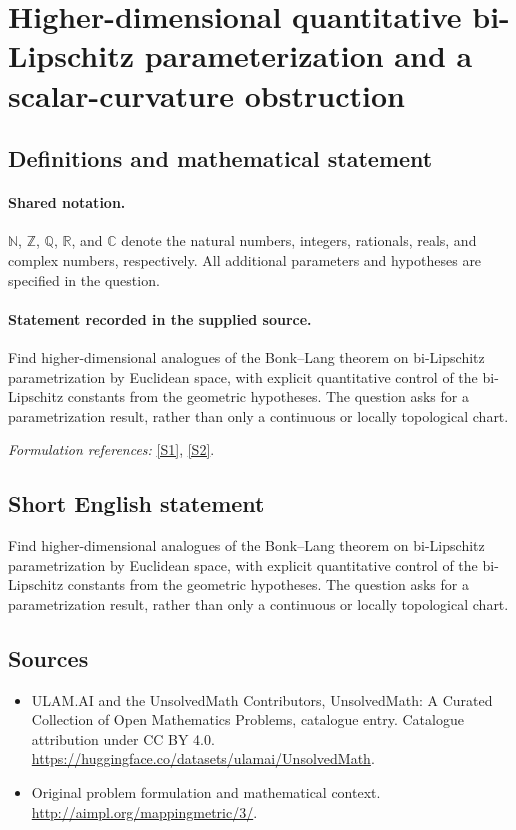 \documentclass[11pt]{article}
\newcommand{\sref}[2]{\hyperlink{source:#1:#2}{[S#2]}}
\begin{document}
\section{Higher-dimensional quantitative bi-Lipschitz parameterization and a scalar-curvature obstruction}\label{statement}

\subsection{Definitions and mathematical statement}

\paragraph{Shared notation.}$\mathbb N$, $\mathbb Z$, $\mathbb Q$, $\mathbb R$, and $\mathbb C$ denote the natural numbers, integers, rationals, reals, and complex numbers, respectively. All additional parameters and hypotheses are specified in the question.


\paragraph{Statement recorded in the supplied source.}
Find higher-dimensional analogues of the Bonk--Lang theorem on bi-Lipschitz parametrization by Euclidean space, with explicit quantitative control of the bi-Lipschitz constants from the geometric hypotheses. The question asks for a parametrization result, rather than only a continuous or locally topological chart.
\par\smallskip\textit{Formulation references:} \sref{statement}{1}, \sref{statement}{2}.
\subsection{Short English statement}
Find higher-dimensional analogues of the Bonk--Lang theorem on bi-Lipschitz parametrization by Euclidean space, with explicit quantitative control of the bi-Lipschitz constants from the geometric hypotheses. The question asks for a parametrization result, rather than only a continuous or locally topological chart.
\subsection{Sources}
\begin{itemize}
\item[\hypertarget{source:statement:1}{S1}] ULAM.AI and the UnsolvedMath Contributors, UnsolvedMath: A Curated Collection of Open Mathematics Problems, catalogue entry. Catalogue attribution under CC BY 4.0.
\url{https://huggingface.co/datasets/ulamai/UnsolvedMath}.
\item[\hypertarget{source:statement:2}{S2}] Original problem formulation and mathematical context.
\url{http://aimpl.org/mappingmetric/3/}.
\end{itemize}
\label{end:statement}
\end{document}
